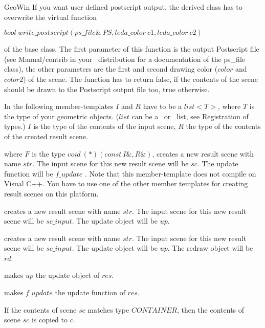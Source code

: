 \begin{ccRefClass}{GeoWin}
If you want user defined postscript output, the derived class has to overwrite the
virtual function

     $bool \ write\_postscript(ps\_file\& \ PS,leda\_color \ c1,leda\_color \ c2)$
     
of the base class. The first parameter of this function is the output Postscript file 
(see Manual/contrib in your \leda\ distribution for a documentation of the ps\_file class),
the other parameters are the first and second drawing color ($color$ and $color2$) of
the scene. The function has to return false, if the contents of the scene should be
drawn to the Postscript output file too, true otherwise.

In the following member-templates    
$I$ and $R$ have to be a $list<T>$, where $T$ is the type of your geometric
objects. ($list$ can be a \stl\ or \leda\ list, see Registration of types.)
$I$ is the type of the contents of the input scene, $R$ the type of the contents
of the created result scene.

{where $F$ is the type 
$void \ (*)(const \ I\&, R\&)$,
creates a new result scene with name $str$.
The input scene for this new result scene will be $sc$.
The update function will be $f\_update$ . 
Note that this member-template does not compile on Visual C++. 
You have to use one of the other member templates for creating 
result scenes on this platform.
}
	     
{creates a new result scene with name $str$.
The input scene for this new result scene will be $sc\_input$.
The update object will be $up$. }

{creates a new result scene with name $str$.
The input scene for this new result scene will be $sc\_input$.    
The update object will be $up$.  
The redraw object will be $rd$. }

{makes $up$ the update object of $res$.}
  
{makes $f\_update$ the update function of $res$.}

{If the contents of scene $sc$ matches type $CONTAINER$, 
then the contents of scene $sc$ is copied to $c$.}


\end{ccRefClass}
